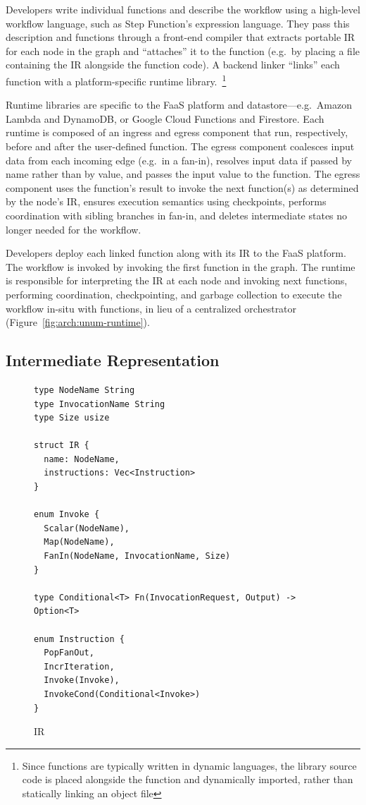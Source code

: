 Developers write individual functions and describe the workflow using a
high-level workflow language, such as Step Function's expression language. They
pass this description and functions through a front-end \name{} compiler that
extracts portable \name{} IR for each node in the graph and ``attaches'' it to
the function (e.g.\ by placing a file containing the IR alongside the function
code). A backend \name{} linker ``links'' each function with a
platform-specific \name{} runtime library.~\footnote{Since functions are
typically written in dynamic languages, the \name{} library source code is
placed alongside the function and dynamically imported, rather than statically
linking an object file}

Runtime libraries are specific to the FaaS platform and datastore---e.g.\ Amazon
Lambda and DynamoDB, or Google Cloud Functions and Firestore. Each runtime is
composed of an ingress and egress component that run, respectively, before and
after the user-defined function. The egress component coalesces input data from
each incoming edge (e.g.\ in a fan-in), resolves input data if passed by name
rather than by value, and passes the input value to the function. The egress
component uses the function's result to invoke the next function(s) as
determined by the node's IR, ensures execution semantics using checkpoints,
performs coordination with sibling branches in fan-in, and deletes intermediate
states no longer needed for the workflow.

Developers deploy each linked function along with its IR to the FaaS platform.
The workflow is invoked by invoking the first function in the graph.  The
\name{} runtime is responsible for interpreting the \name{} IR at each node and
invoking next functions, performing coordination, checkpointing, and garbage
collection to execute the workflow in-situ with functions, in lieu of a
centralized orchestrator (Figure~\ref{fig:arch:unum-runtime}).

\subsection{\name{} Intermediate Representation}\label{sec:design:ir}

\begin{figure}[t!]
    \centering
    \begin{verbatim}
type NodeName String
type InvocationName String
type Size usize

struct IR {
  name: NodeName,
  instructions: Vec<Instruction>
}

enum Invoke {
  Scalar(NodeName),
  Map(NodeName),
  FanIn(NodeName, InvocationName, Size)
}

type Conditional<T> Fn(InvocationRequest, Output) -> Option<T>

enum Instruction {
  PopFanOut,
  IncrIteration,
  Invoke(Invoke),
  InvokeCond(Conditional<Invoke>)
}
    \end{verbatim}
    \caption{\name{} IR}
    \label{fig:design:irschema}
\end{figure}


